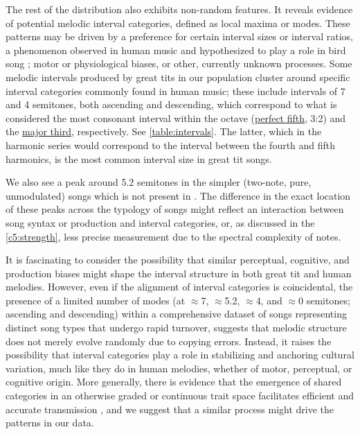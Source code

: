 The rest of the distribution also exhibits non-random features. It reveals evidence of potential melodic interval categories, defined as local maxima or modes. These patterns may be driven by a preference for certain interval sizes or interval ratios, a phenomenon observed in human music and hypothesized to play a role in bird song \autocite{doolittle2012, doolittle2014}; motor or physiological biases, or other, currently unknown processes. Some melodic intervals produced by great tits in our population cluster around specific interval categories commonly found in human music; these include intervals of 7 and 4 semitones, both ascending and descending, which correspond to what is considered the most consonant interval within the octave (\href{https://en.wikipedia.org/wiki/Perfect_fifth}{perfect fifth}, 3:2) and the \href{https://upload.wikimedia.org/wikipedia/commons/transcoded/2/2a/Just_major_third_on_C.mid/Just_major_third_on_C.mid.mp3}{major third}, respectively. See \autoref{table:intervals}. The latter, which in the harmonic series would correspond to the interval between the fourth and fifth harmonics, is the most common interval size in great tit songs.

We also see a peak around 5.2 semitones in the simpler (two-note, pure, unmodulated) songs  which is not present in . The difference in the exact location of these peaks across the typology of songs might reflect an interaction between song syntax or production and interval categories, or, as discussed in the \autoref{c5:strength}, less precise measurement due to the spectral complexity of notes.

It is fascinating to consider the possibility that similar perceptual, cognitive, and production biases might shape the interval structure in both great tit and human melodies. However, even if the alignment of interval categories is coincidental, the presence of a limited number of modes (at $\approx$7, $\approx$5.2, $\approx$4, and $\approx$0 semitones; ascending and descending) within a comprehensive dataset of songs representing distinct song types that undergo rapid turnover, suggests that melodic structure does not merely evolve randomly due to copying errors. Instead, it raises the possibility that interval categories play a role in stabilizing and anchoring cultural variation, much like they do in human melodies, whether of motor, perceptual, or cognitive origin. More generally, there is evidence that the emergence of shared categories in an otherwise graded or continuous trait space facilitates efficient and accurate transmission  \autocite{falandays2022, tchernichovski2017, silvey2019, decastro-arrazola2019, kirby2017}, and we suggest that a similar process might drive the patterns in our data.

